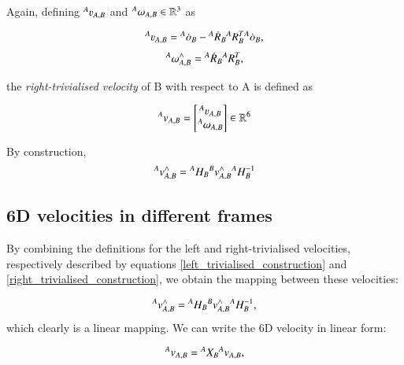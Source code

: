 Again, defining $\leftsuperscript{A}{\varv}{A,B}$ and ${}^{A}{\omega}_{A,B} \in \mathbb{R}^3$ as 

\begin{equation}
    \leftsuperscript{A}{\varv}{A,B} = \leftsuperscript{A}{\dot{o}}{B} - \leftsuperscript{A}{\dot{R}}{B}\leftsuperscript{A}{R}{B}^{T} \leftsuperscript{A}{\dot{o}}{B},
\end{equation}
\begin{equation}
    {}^{A}{\omega}_{A,B}^{\wedge} = {}^{A}{\dot{R}}_{B}{}^{A}{R}_{B}^{T},
\end{equation}

the \textit{right-trivialised velocity} of B with respect to A is defined as

\begin{equation} \label{def_right_trivialised_velocity}
    \leftsuperscript{A}{v}{A,B} = 
    \begin{bmatrix}
        \leftsuperscript{A}{\varv}{A,B} \\
        \leftsuperscript{A}{\omega}{A,B}
    \end{bmatrix}
    \in \mathbb{R}^6
\end{equation}

By construction,
\begin{equation} \label{right_trivialised_construction}
    {}^{A}{v}_{A,B}^{\wedge} = {}^{A}{H}_{B} {}^{B}{v}_{A,B}^{\wedge}{}^{A}{H}_{B}^{-1}
\end{equation}

\subsection{6D velocities in different frames}

By combining the definitions for the left and right-trivialised velocities, respectively described by equations \ref{left_trivialised_construction} and \ref{right_trivialised_construction}, we obtain the mapping between these velocities:

\begin{equation}
    {}^{A}{v}_{A,B}^{\wedge} = {}^{A}{H}_{B}{}^{B}{v}_{A,B}^{\wedge}{}^{A}{H}_{B}^{-1},
\end{equation}
which clearly is a linear mapping.
We can write the 6D velocity in linear form:

\begin{equation}\label{6d_velocity_linear_mapping}
    {}^{A}{v}_{A,B} = {}^{A}{X}_{B}{}^{A}{v}_{A,B},
\end{equation}

